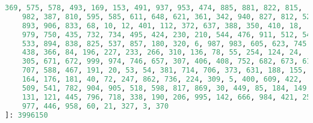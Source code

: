 \documentclass[a4paper, 12pt]{article}
\theoremstyle{definition}
\begin{document}
\begin{lstlisting}[language=Python]
    369, 575, 578, 493, 169, 153, 491, 937, 953, 474, 885, 881, 822, 815,
    982, 387, 810, 595, 585, 611, 648, 621, 361, 342, 940, 827, 812, 527,
    893, 906, 833, 68, 10, 12, 401, 112, 372, 637, 388, 350, 410, 18,
    979, 750, 435, 732, 734, 495, 424, 230, 210, 544, 476, 911, 512, 542,
    533, 894, 838, 825, 537, 857, 180, 320, 6, 987, 983, 605, 623, 745,
    438, 366, 84, 196, 227, 233, 266, 310, 136, 78, 55, 254, 124, 24,
    305, 671, 672, 999, 974, 746, 657, 307, 406, 408, 752, 682, 673, 617,
    707, 588, 467, 191, 20, 53, 54, 381, 714, 706, 373, 631, 188, 155,
    164, 176, 181, 40, 72, 247, 862, 736, 224, 309, 5, 400, 609, 422,
    509, 541, 782, 904, 905, 518, 598, 817, 869, 30, 449, 85, 184, 149,
    131, 121, 445, 796, 718, 338, 190, 206, 995, 142, 666, 984, 421, 253,
    977, 446, 958, 60, 21, 327, 3, 370
]: 3996150
\end{lstlisting}
\RTL
\end{document}
